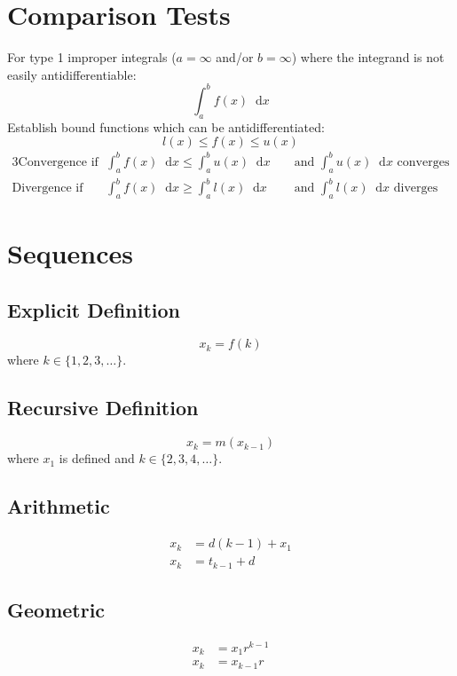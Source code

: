 \documentclass[12pt]{article}
\newcommand*{\D}[1]{\mathop{}\!\mathrm{d} #1}
\newenvironment{rmskip}{\setlength{\abovedisplayskip}{0pt}%
  \setlength{\belowdisplayskip}{0pt}\ignorespaces}%
  {\ignorespacesafterend}
\begin{document}
\section*{Comparison Tests}
For type 1 improper integrals (\(a = \infty\) and\slash or \(b = \infty\))
where the integrand is not easily antidifferentiable:
\[
  \int_a^b f(x) \D{x}
\]
Establish bound functions which can be antidifferentiated:
\[
  l(x) \le f(x) \le u(x)
\]
\begin{rmskip}
  \begin{alignat*}{3}
    \text{Convergence if } &\int_a^b f(x) \D{x} \le \int_a^b u(x) \D{x}
      &&\text{ and } \int_a^b u(x) \D{x} \text{ converges}\\
    \text{Divergence if } &\int_a^b f(x) \D{x} \ge \int_a^b l(x) \D{x}
      &&\text{ and } \int_a^b l(x) \D{x} \text{ diverges}
  \end{alignat*}
\end{rmskip}
\section*{Sequences}
\subsection*{Explicit Definition}
\[
  x_k = f(k)
\]
where \(k \in \{1,2,3,\dots\}\).
\subsection*{Recursive Definition}
\[
  x_k = m(x_{k-1})
\]
where \(x_1\) is defined and \(k \in \{2,3,4,\dots\}\).
\subsection*{Arithmetic}
\begin{rmskip}
  \begin{align*}
    x_k &= d(k-1) + x_1\\
    x_k &= t_{k-1} + d
  \end{align*}
\end{rmskip}
\subsection*{Geometric}
\begin{rmskip}
  \begin{align*}
    x_k &= x_1r^{k-1}\\
    x_k &= x_{k-1} r
  \end{align*}
\end{rmskip}
\end{document}
